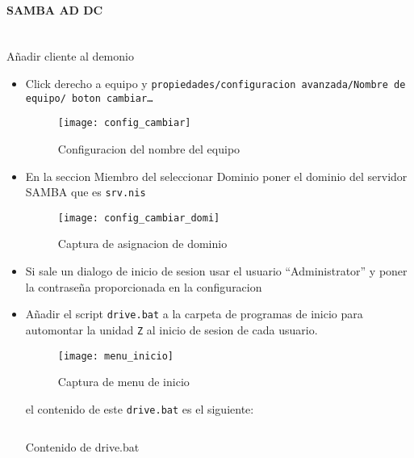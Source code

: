 \documentclass[../main.tex]{subfiles}
\begin{document}
\paragraph{SAMBA AD DC}\ \\Añadir cliente al demonio
\begin{itemize}
  \item Click derecho a equipo y \texttt{propiedades/configuracion avanzada/Nombre de equipo/ boton cambiar\ldots}
        \begin{figure}[H]
          \centering
          \texttt{[image: config\_cambiar]}
          \caption{Configuracion del nombre del equipo}\label{fig:config_cambiar}
        \end{figure}
        \newpage{}

  \item En la seccion Miembro del seleccionar Dominio poner el dominio del servidor SAMBA que es \texttt{srv.nis}
        \begin{figure}[H]
          \centering
          \texttt{[image: config\_cambiar\_domi]}
          \caption{Captura de asignacion de dominio}\label{fig:config_cambiar_domi}
        \end{figure}
        \newpage{}
  \item Si sale un dialogo de inicio de sesion usar el usuario ``Administrator''
        y poner la contraseña proporcionada en la configuracion
  \item Añadir el script \texttt{drive.bat} a la carpeta de programas
        de inicio para automontar la unidad \texttt{Z} al inicio de sesion de
        cada usuario.
        \begin{figure}[H]
          \centering
          \texttt{[image: menu\_inicio]}
          \caption{Captura de menu de inicio}\label{fig:menu_inicio}
        \end{figure}

        el contenido de este \texttt{drive.bat} es el siguiente:


        \begin{listing}[H]
          \inputminted{bat}{../configs/drive.bat}
          \caption{Contenido de drive.bat}
          \label{listing:drive.sh}
        \end{listing}



\end{itemize}
\end{document}
